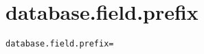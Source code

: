 \section{database.field.prefix}
\label{configuration:DatabaseFieldPrefix}
\ClearAPI
\TODO
{}
\begin{lstlisting}[style=Props,caption={Usage example for \textit{database.field.prefix}}]
database.field.prefix=
\end{lstlisting}